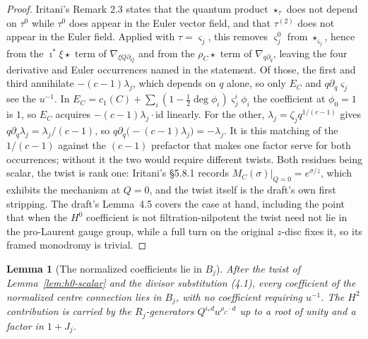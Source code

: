 \documentclass[11pt]{article}
\newtheorem{lemma}[theorem]{Lemma}
\theoremstyle{definition}
\theoremstyle{remark}
\begin{document}
\begin{proof}
Iritani's Remark 2.3 states that the quantum product $\star_\tau$ does not depend
on $\tau^0$ while $\tau^0$ does appear in the Euler vector field, and that
$\tau^{(2)}$ does not appear in the Euler field. Applied with $\tau=\varsigma_j$,
this removes $\varsigma_j^0$ from $\star_{\varsigma_j}$, hence from the
$\imath^*\xi\star$ term of $\nabla_{\xi Q\partial_Q}$ and from the
$\rho_C\star$ term of $\nabla_{q\partial_q}$, leaving the four derivative and
Euler occurrences named in the statement. Of those, the first and third annihilate
$-(c-1)\lambda_j$, which depends on $q$ alone, so only $E_C$ and
$q\partial_q\varsigma_j$ see the $u^{-1}$. In
$E_C=c_1(C)+\sum_i(1-\tfrac12\deg\phi_i)\varsigma_j^i\phi_i$ the coefficient at
$\phi_0=1$ is $1$, so $E_C$ acquires $-(c-1)\lambda_j\cdot\mathrm{id}$ linearly.
For the other, $\lambda_j=\zeta_jq^{1/(c-1)}$ gives
$q\partial_q\lambda_j=\lambda_j/(c-1)$, so
$q\partial_q\bigl(-(c-1)\lambda_j\bigr)=-\lambda_j$. It is this matching of the
$1/(c-1)$ against the $(c-1)$ prefactor that makes one factor serve for both
occurrences; without it the two would require different twists. Both residues
being scalar, the twist is rank one: Iritani's \S5.8.1 records
$M_C(\sigma)|_{Q=0}=e^{\sigma/z}$, which exhibits the mechanism at $Q=0$, and the
twist itself is the draft's own first stripping. The draft's Lemma~4.5 covers the
case at hand, including the point that when the $H^0$ coefficient is not
filtration-nilpotent the twist need not lie in the pro-Laurent gauge group, while
a full turn on the original $z$-disc fixes it, so its framed monodromy is trivial.
\end{proof}

\begin{lemma}[The normalized coefficients lie in $B_j$]
\label{lem:descent}
After the twist of Lemma~\ref{lem:h0-scalar} and the divisor substitution
\textup{(4.1)}, every coefficient of the normalized centre connection lies in
$B_j$, with no coefficient requiring $u^{-1}$. The $H^2$ contribution is carried
by the $R_j$-generators $Q^{i_*d}u^{\rho_C\cdot d}$ up to a root of unity and a
factor in $1+J_j$.
\end{lemma}
\end{document}

